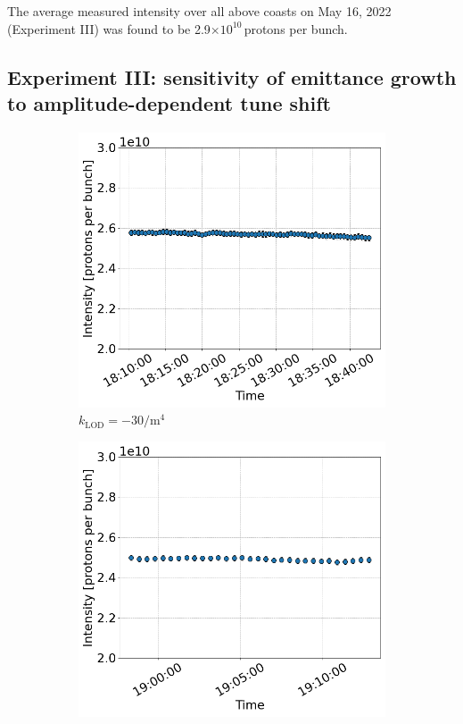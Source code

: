  The average measured intensity over all above coasts on May 16, 2022 (Experiment III) was found to be 2.9$\times 10^{10}$\,protons per bunch. 
 

 \subsection{Experiment III: sensitivity of emittance growth to amplitude-dependent tune shift}\label{subsec:2022_exp3_intensity}

 \begin{figure}[htp]
    \centering
    \begin{subfigure}{.45\textwidth}
        \centering
        \includegraphics[width=.95\linewidth]{images/app_e/intensity_cc_md_12Sep22_coast_6.png}  
        \caption{$k_\mathrm{LOD}=-30 \mathrm{/m^{4}}$}
    \end{subfigure}
    \begin{subfigure}{.45\textwidth}
        \centering
        \includegraphics[width=.95\linewidth]{images/app_e/intensity_cc_md_12Sep22_coast_7.png}  

\end{subfigure}
\end{figure}
